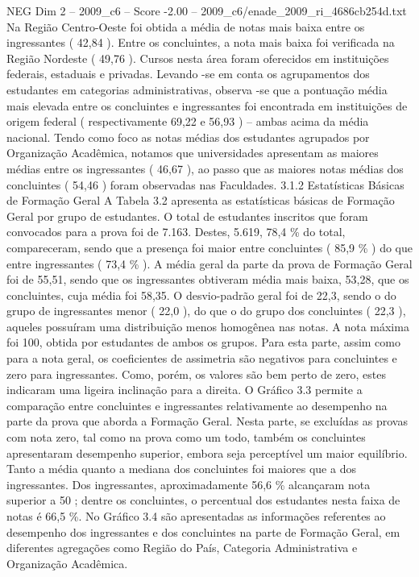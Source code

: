 \begin{textsample}{NEG Dim 2 – 2009\_c6 – Score -2.00 – 2009\_c6/enade\_2009\_ri\_4686cb254d.txt}
Na Região Centro-Oeste foi obtida a média de notas mais baixa entre os ingressantes ( 42,84 ).
Entre os concluintes, a nota mais baixa foi verificada na Região Nordeste ( 49,76 ).
Cursos nesta área foram oferecidos em instituições federais, estaduais e privadas.
Levando -se em conta os agrupamentos dos estudantes em categorias administrativas, observa -se que a pontuação média mais elevada entre os concluintes e ingressantes foi encontrada em instituições de origem federal ( respectivamente 69,22 e 56,93 ) – ambas acima da média nacional.
Tendo como foco as notas médias dos estudantes agrupados por Organização Acadêmica, notamos que universidades apresentam as maiores médias entre os ingressantes ( 46,67 ), ao passo que as maiores notas médias dos concluintes ( 54,46 ) foram observadas nas Faculdades. 3.1.2 Estatísticas Básicas de Formação Geral A Tabela 3.2 apresenta as estatísticas básicas de Formação Geral por grupo de estudantes.
O total de estudantes inscritos que foram convocados para a prova foi de 7.163.
Destes, 5.619, 78,4 \% do total, compareceram, sendo que a presença foi maior entre concluintes ( 85,9 \% ) do que entre ingressantes ( 73,4 \% ).
A média geral da parte da prova de Formação Geral foi de 55,51, sendo que os ingressantes obtiveram média mais baixa, 53,28, que os concluintes, cuja média foi 58,35.
O desvio-padrão geral foi de 22,3, sendo o do grupo de ingressantes menor ( 22,0 ), do que o do grupo dos concluintes ( 22,3 ), aqueles possuíram uma distribuição menos homogênea nas notas.
A nota máxima foi 100, obtida por estudantes de ambos os grupos.
Para esta parte, assim como para a nota geral, os coeficientes de assimetria são negativos para concluintes e zero para ingressantes.
Como, porém, os valores são bem perto de zero, estes indicaram uma ligeira inclinação para a direita.
O Gráfico 3.3 permite a comparação entre concluintes e ingressantes relativamente ao desempenho na parte da prova que aborda a Formação Geral.
Nesta parte, se excluídas as provas com nota zero, tal como na prova como um todo, também os concluintes apresentaram desempenho superior, embora seja perceptível um maior equilíbrio.
Tanto a média quanto a mediana dos concluintes foi maiores que a dos ingressantes.
Dos ingressantes, aproximadamente 56,6 \% alcançaram nota superior a 50 ; dentre os concluintes, o percentual dos estudantes nesta faixa de notas é 66,5 \%.
No Gráfico 3.4 são apresentadas as informações referentes ao desempenho dos ingressantes e dos concluintes na parte de Formação Geral, em diferentes agregações como Região do País, Categoria Administrativa e Organização Acadêmica.

\end{textsample}
